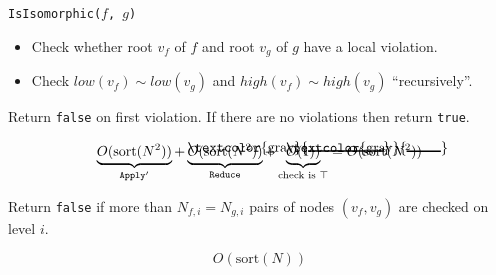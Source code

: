 \documentclass[english, aspectratio=169]{beamer}
\newcommand\hcancel[2][black]{\setbox0=\hbox{$#2$}%
  \rlap{\raisebox{.35\ht0}{\textcolor{#1}{\rule{\wd0}{1pt}}}}#2}
\newcommand{\sort}[0]{\text{sort}}
\begin{document}

\begin{frame}

  \begin{figure}
    \centering

    \begin{tikzpicture}[scale=1, every node/.style={transform shape}]
      
    \end{tikzpicture}
  \end{figure}
  
\end{frame}

\begin{frame}

  \texttt{IsIsomorphic($f$, $g$)}
  \begin{itemize}
  \item Check whether root $v_f$ of $f$ and root $v_g$ of $g$ have a local violation.
  \item Check $\mathit{low}(v_f) \sim \mathit{low}(v_g)$ and $\mathit{high}(v_f)
    \sim \mathit{high}(v_g)$ ``recursively''.
  \end{itemize}
  Return \texttt{false} on first violation. If there are no violations then return \texttt{true}.

  \pause
  \begin{equation*}
    \underbrace{O(\sort(N^2))}_{\texttt{Apply}'}
    + \underbrace{\hcancel[gray]{O(\sort(N^2))}}_{\texttt{Reduce}}
    + \underbrace{\hcancel[gray]{O(1))}}_{\text{check is } \top}
    = O(\sort(N^2))
  \end{equation*}
  
\end{frame}

\begin{frame}
  \begin{figure}
    \centering

    \begin{tikzpicture}[scale=0.9, every node/.style={transform shape}]
      
    \end{tikzpicture}
  \end{figure}

  \pause
  Return \texttt{false} if more than $N_{f,i} = N_{g,i}$ pairs of nodes $(v_f,
  v_g)$ are checked on level $i$.

  \begin{equation*}
    O(\sort(N))
  \end{equation*}
  
\end{frame}
\end{document}
